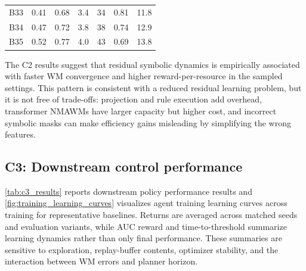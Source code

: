 \documentclass{article}
\theoremstyle{plain}
\theoremstyle{definition}
\theoremstyle{remark}
\begin{document}
\begin{table}[h!]
{\begin{tabular}{lcccccc}
      B33                              &
      0.41                             &
      0.68                             &
      3.4                              &
      34                               &
      0.81                             &
      11.8                               \\

      B34                              &
      0.47                             &
      0.72                             &
      3.8                              &
      38                               &
      0.74                             &
      12.9                               \\

      B35                              &
      0.52                             &
      0.77                             &
      4.0                              &
      43                               &
      0.69                             &
      13.8                               \\

      \bottomrule
    \end{tabular}
  }
\end{table}

The C2 results suggest that residual symbolic dynamics is empirically associated with faster WM convergence and higher reward-per-resource in the sampled settings. This pattern is consistent with a reduced residual learning problem, but it is not free of trade-offs: projection and rule execution add overhead, transformer NMAWMs have larger capacity but higher cost, and incorrect symbolic masks can make efficiency gains misleading by simplifying the wrong features.

\subsection{C3: Downstream control performance}

\autoref{tab:c3_results} reports downstream policy performance results and \autoref{fig:training_learning_curves} visualizes agent training learning curves across training for representative baselines. Returns are averaged across matched seeds and evaluation variants, while AUC reward and time-to-threshold summarize learning dynamics rather than only final performance. These summaries are sensitive to exploration, replay-buffer contents, optimizer stability, and the interaction between WM errors and planner horizon.
\end{document}
